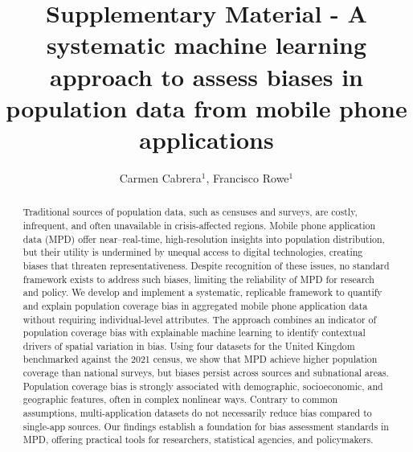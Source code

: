 \documentclass[]{rsos}%
\begin{document}
\title{Supplementary Material - A systematic machine learning approach to assess biases in population data from mobile phone applications}

\author{
Carmen Cabrera$^{1}$,
Francisco Rowe$^{1}$}

\address{
  $^{1}$Geographic Data Science Lab, Department of Geography and Planning, University of Liverpool, Liverpool, United Kingdom.\\
  $^{}$}
\subject{
Mobile phone data,
Human mobility,
Explainable AI,
Spatial analysis}



\begin{abstract}
Traditional sources of population data, such as censuses and surveys, are costly, infrequent, and often unavailable in crisis-affected regions. Mobile phone application data (MPD) offer near--real-time, high-resolution insights into population distribution, but their utility is undermined by unequal access to digital technologies, creating biases that threaten representativeness. Despite recognition of these issues, no standard framework exists to address such biases, limiting the reliability of MPD for research and policy. We develop and implement a systematic, replicable framework to quantify and explain population coverage bias in aggregated mobile phone application data without requiring individual-level attributes. The approach combines an indicator of population coverage bias with explainable machine learning to identify contextual drivers of spatial variation in bias. Using four datasets for the United Kingdom benchmarked against the 2021 census, we show that MPD achieve higher population coverage than national surveys, but biases persist across sources and subnational areas. Population coverage bias is strongly associated with demographic, socioeconomic, and geographic features, often in complex nonlinear ways. Contrary to common assumptions, multi-application datasets do not necessarily reduce bias compared to single-app sources. Our findings establish a foundation for bias assessment standards in MPD, offering practical tools for researchers, statistical agencies, and policymakers.
\end{abstract}
\end{document}
